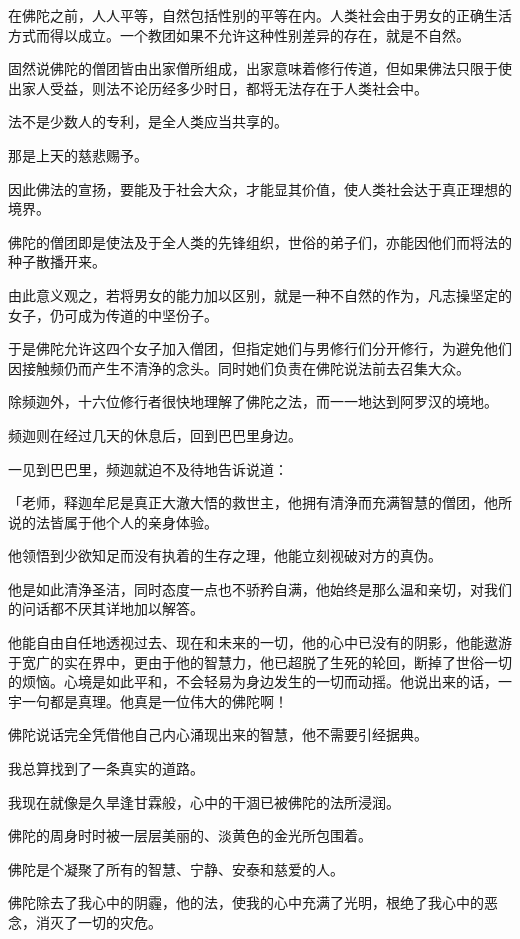 \documentclass[twoside,openany]{book}
\begin{document}
在佛陀之前，人人平等，自然包括性别的平等在内。人类社会由于男女的正确生活方式而得以成立。一个教团如果不允许这种性别差异的存在，就是不自然。

固然说佛陀的僧团皆由出家僧所组成，出家意味着修行传道，但如果佛法只限于使出家人受益，则法不论历经多少时日，都将无法存在于人类社会中。

法不是少数人的专利，是全人类应当共享的。

那是上天的慈悲赐予。

因此佛法的宣扬，要能及于社会大众，才能显其价值，使人类社会达于真正理想的境界。

佛陀的僧团即是使法及于全人类的先锋组织，世俗的弟子们，亦能因他们而将法的种子散播开来。

由此意义观之，若将男女的能力加以区别，就是一种不自然的作为，凡志操坚定的女子，仍可成为传道的中坚份子。

于是佛陀允许这四个女子加入僧团，但指定她们与男修行们分开修行，为避免他们因接触频仍而产生不清浄的念头。同时她们负责在佛陀说法前去召集大众。

除频迦外，十六位修行者很快地理解了佛陀之法，而一一地达到阿罗汉的境地。

频迦则在经过几天的休息后，回到巴巴里身边。

一见到巴巴里，频迦就迫不及待地告诉说道：

「老师，释迦牟尼是真正大澈大悟的救世主，他拥有清浄而充满智慧的僧团，他所说的法皆属于他个人的亲身体验。

他领悟到少欲知足而没有执着的生存之理，他能立刻视破对方的真伪。

他是如此清浄圣洁，同时态度一点也不骄矜自满，他始终是那么温和亲切，对我们的问话都不厌其详地加以解答。

他能自由自任地透视过去、现在和未来的一切，他的心中已没有的阴影，他能遨游于宽广的实在界中，更由于他的智慧力，他已超脱了生死的轮回，断掉了世俗一切的烦恼。心境是如此平和，不会轻易为身边发生的一切而动摇。他说出来的话，一宇一句都是真理。他真是一位伟大的佛陀啊！

佛陀说话完全凭借他自己内心涌现出来的智慧，他不需要引经据典。

我总算找到了一条真实的道路。

我现在就像是久旱逢甘霖般，心中的干涸已被佛陀的法所浸润。

佛陀的周身时时被一层层美丽的、淡黄色的金光所包围着。

佛陀是个凝聚了所有的智慧、宁静、安泰和慈爱的人。

佛陀除去了我心中的阴霾，他的法，使我的心中充满了光明，根绝了我心中的恶念，消灭了一切的灾危。
\end{document}

